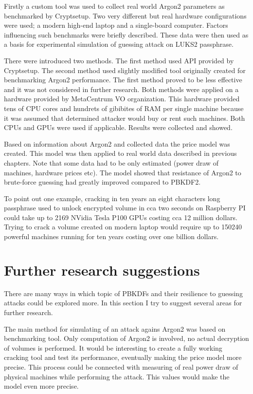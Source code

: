 \documentclass[nolof]{fithesis3}
\begin{document}
Firstly a custom tool was used to collect real world Argon2 parameters as benchmarked by Cryptsetup. Two very different but real hardware configurations were used; a modern high-end laptop and a single-board computer. Factors influencing such benchmarks were briefly described. These data were then used as a basis for experimental simulation of guessing attack on LUKS2 passphrase.

There were introduced two methods. The first method used API provided by Cryptsetup. The second method used slightly modified tool originally created for benchmarking Argon2 performance. The first method proved to be less effective and it was not considered in further research. Both methods were applied on a hardware provided by MetaCentrum VO organization. This hardware provided tens of CPU cores and hundrets of gibibites of RAM per single machine because it was assumed that determined attacker would buy or rent such machines. Both CPUs and GPUs were used if applicable. Results were collected and showed.

Based on information about Argon2 and collected data the price model was created. This model was then applied to real world data described in previous chapters. Note that some data had to be only estimated (power draw of machines, hardware prices etc). The model showed that resistance of Argon2 to brute-force guessing had greatly improved compared to PBKDF2.

To point out one example, cracking in ten years an eight characters long passphrase used to unlock encrypted volume in cca two seconds on Raspberry PI could take up to 2169 NVidia Tesla P100 GPUs costing cca 12 million dollars. Trying to crack a volume created on modern laptop would require up to 150240 powerful machines running for ten years costing over one billion dollars.

\section{Further research suggestions}
There are many ways in which topic of PBKDFs and their resilience to guessing attacks could be explored more. In this section I try to suggest several areas for further research.

The main method for simulating of an attack agains Argon2 was based on benchmarking tool. Only computation of Argon2 is involved, no actual decryption of volumes is performed. It would be interesting to create a fully working cracking tool and test its performance, eventually making the price model more precise. This process could be connected with measuring of real power draw of physical machines while performing the attack. This values would make the model even more precise.
\end{document}
